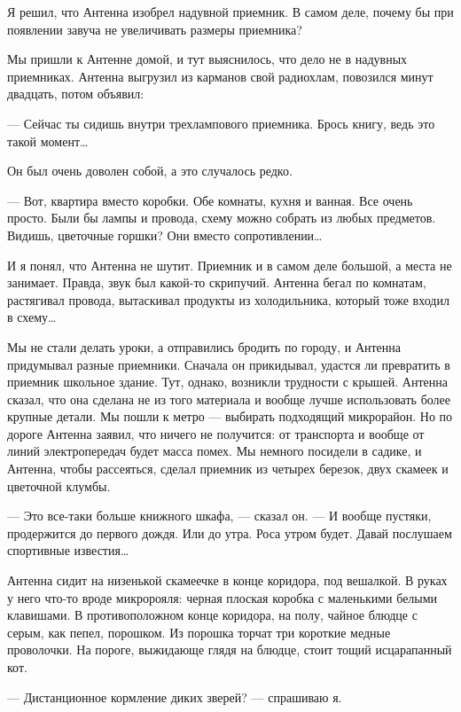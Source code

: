    Я решил, что Антенна  изобрел надувной приемник. В  самом деле, почему  бы
   при появлении завуча не увеличивать размеры приемника?

   Мы пришли  к Антенне  домой, и  тут  выяснилось, что  дело не  в  надувных
   приемниках. Антенна выгрузил из  карманов свой радиохлам, повозился  минут
   двадцать, потом объявил:

   — Сейчас ты сидишь внутри  трехлампового приемника. Брось книгу, ведь  это
   такой момент…

   Он был очень доволен собой, а это случалось редко.

   — Вот, квартира  вместо коробки. Обе  комнаты, кухня и  ванная. Все  очень
   просто. Были бы лампы и провода,  схему можно собрать из любых  предметов.
   Видишь, цветочные горшки? Они вместо сопротивлении…

   И я понял, что Антенна не шутит. Приемник и в самом деле большой, а  места
   не занимает.  Правда,  звук  был  какой-то  скрипучий.  Антенна  бегал  по
   комнатам, растягивал провода, вытаскивал продукты из холодильника, который
   тоже входил в схему…

   Мы не  стали делать  уроки, а  отправились бродить  по городу,  и  Антенна
   придумывал разные приемники. Сначала он прикидывал, удастся ли  превратить
   в приемник  школьное здание.  Тут, однако,  возникли трудности  с  крышей.
   Антенна сказал,  что она  сделана  не из  того  материала и  вообще  лучше
   использовать более крупные детали. Мы пошли к метро — выбирать  подходящий
   микрорайон. Но  по дороге  Антенна  заявил, что  ничего не  получится:  от
   транспорта и вообще от линий электропередач будет масса помех. Мы  немного
   посидели в садике, и Антенна, чтобы рассеяться, сделал приемник из четырех
   березок, двух скамеек и цветочной клумбы.

   — Это все-таки  больше книжного шкафа,  — сказал он.  — И вообще  пустяки,
   продержится до  первого  дождя.  Или  до утра.  Роса  утром  будет.  Давай
   послушаем спортивные известия…

   Антенна сидит на  низенькой скамеечке  в конце коридора,  под вешалкой.  В
   руках у него что-то вроде микророяля: черная плоская коробка с  маленькими
   белыми клавишами. В противоположном конце коридора, на полу, чайное блюдце
   с серым,  как  пепел, порошком.  Из  порошка торчат  три  короткие  медные
   проволочки. На пороге, выжидающе глядя на блюдце, стоит тощий исцарапанный
   кот.

   — Дистанционное кормление диких зверей? — спрашиваю я.

